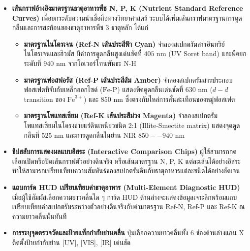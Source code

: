 \documentclass[12pt,a4paper,oneside]{book}
\begin{document}
\begin{itemize}
    \item \textbf{เส้นกราฟอ้างอิงมาตรฐานธาตุอาหารพืช N, P, K (Nutrient Standard Reference Curves)} เพื่อยกระดับความน่าเชื่อถือทางวิทยาศาสตร์ ระบบได้เพิ่มเส้นกราฟมาตรฐานการดูดกลืนและการสะท้อนของธาตุอาหารพืช 3 ธาตุหลัก ได้แก่
    \begin{itemize}
        \item \textbf{มาตรฐานไนโตรเจน (Ref-N เส้นประสีฟ้า Cyan)} จำลองสเปกตรัมสารอินทรีย์ไนโตรเจนและฮิวมัส มีค่าการดูดกลืนสูงเด่นชัดที่ $405\text{ nm}$ (UV Soret band) และพีคยกระดับที่ $940\text{ nm}$ จากโอเวอร์โทนพันธะ $\text{N-H}$
        \item \textbf{มาตรฐานฟอสฟอรัส (Ref-P เส้นประสีส้ม Amber)} จำลองสเปกตรัมสารประกอบฟอสเฟตที่จับกับเหล็กออกไซด์ ($\text{Fe-P}$) แสดงพีคดูดกลืนเด่นชัดที่ $630\text{ nm}$ ($d-d$ transition ของ $\text{Fe}^{3+}$) และ $850\text{ nm}$ ซึ่งตรงกับไหล่การสั่นสะเทือนของหมู่ฟอสเฟต
        \item \textbf{มาตรฐานโพแทสเซียม (Ref-K เส้นประสีม่วง Magenta)} จำลองสเปกตรัมโพแทสเซียมในโครงข่ายแร่ดินเหนียวชนิด 2:1 (Illite-Smectite matrix) แสดงจุดดูดกลืนที่ $525\text{ nm}$ และการดูดกลืนในย่าน NIR $850--940\text{ nm}$
    \end{itemize}
    \item \textbf{ชิปสลับการแสดงผลแบบอิสระ (Interactive Comparison Chips)} ผู้ใช้สามารถกดเลือกเปิดหรือปิดเส้นกราฟตัวอย่างดินจริง หรือเส้นมาตรฐาน N, P, K แต่ละเส้นได้อย่างอิสระ ทำให้สามารถเปรียบเทียบความสัมพันธ์ของสเปกตรัมดินกับธาตุอาหารแต่ละชนิดได้อย่างชัดเจน
    \item \textbf{แถบการ์ด HUD เปรียบเทียบค่าธาตุอาหาร (Multi-Element Diagnostic HUD)} เมื่อผู้ใช้สัมผัสเลือกความยาวคลื่นใด ๆ การ์ด HUD ด้านล่างจะแสดงข้อมูลเจาะลึกพร้อมแถบเปรียบเทียบค่าสเปกตรัมระหว่างตัวอย่างดินจริงกับค่ามาตรฐาน Ref-N, Ref-P และ Ref-K ณ ความยาวคลื่นนั้นทันที
    \item \textbf{การระบุจุดตรวจวัดและป้ายแท็กกำกับย่านคลื่น} ปุ่มเลือกความยาวคลื่นทั้ง 6 ช่องด้านล่างแกน X ติดตั้งป้ายกำกับย่าน [UV], [VIS], [IR] เด่นชัด
\end{itemize}
\end{document}

